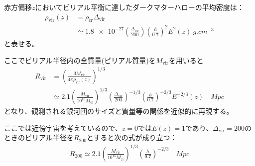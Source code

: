 赤方偏移$z$においてビリアル平衡に達したダークマターハローの平均密度は：
\begin{align}
	\rho_\text{vir}(z) &= \rho_\text{cr} \Delta_\text{vir} \\
	&\simeq \num{1.8e-27} \left( \frac{\Delta_\text{vir}}{200}\right) \left(\frac{h}{0.7}\right)^2 E^2(z) \ \si{g. cm^{-3}}
\end{align}
と表せる。

ここでビリアル半径内の全質量(ビリアル質量)を$M_\text{vir}$を用いると
\begin{align}
	R_\text{vir} &= \left( \frac{3 M_\text{vir}}{4 \pi \rho_\text{vir}(z)} \right)^{1/3} \\
	&\simeq 2.1 \left( \frac{M_\text{vir}}{10^{15} M_\odot} \right)^{1/3} \left( \frac{\Delta_\text{vir}}{200} \right)^{-1/3} \left( \frac{h}{0.7} \right)^{-2/3} E^{-2/3}(z) \quad \si{Mpc}
\end{align}
となり、観測される銀河団のサイズと質量等の関係を近似的に再現する。

ここでは近傍宇宙を考えているので、$z=0$では$E(z) = 1$であり、$\Delta_\text{vir} = 200$のときのビリアル半径を$R_{200}$とすると次の式が成り立つ：
\begin{align}
	R_{200} \simeq 2.1 \left( \frac{M_\text{vir}}{10^{15} M_\odot} \right)^{1/3} \left( \frac{h}{0.7} \right)^{-2/3} \quad \si{Mpc}
\end{align}


%	
%	
%	
%	
%	
%	
